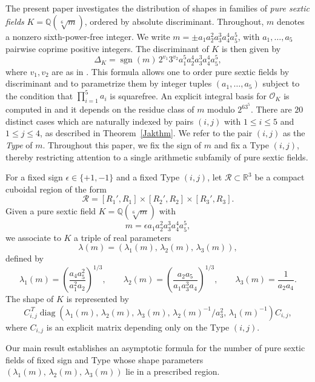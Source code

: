 \documentclass[table]{amsart}
\newcommand{\Q}{\mathbb{Q}}
\newcommand{\cO}{\mathcal{O}}
\newcommand{\op}[1]{\operatorname{#1}}
\numberwithin{equation}{section}
\begin{document}
The present paper investigates the distribution of shapes in families of \emph{pure sextic fields} $K=\Q(\sqrt[6]{m})$,
ordered by absolute discriminant. Throughout, $m$ denotes a nonzero sixth-power-free integer. We write $m=\pm a_1 a_2^2 a_3^3 a_4^4 a_5^5$, with $a_1,\dots,a_5$ pairwise coprime positive integers. The discriminant of $K$ is then given by
\begin{equation}\label{v_1 v_2}
\Delta_K=\operatorname{sgn}(m)\, 2^{v_1}3^{v_2} a_1^5 a_2^4 a_3^3 a_4^4 a_5^5,
\end{equation}
where $v_1, v_2$ are as in \cite[Theorem 3.1]{J21}. This formula allows one to order pure sextic fields by discriminant and to parametrize them by integer tuples $(a_1,\dots,a_5)$ subject to the condition that $\prod_{i=1}^5 a_i$ is squarefree. An explicit integral basis for $\cO_K$ is computed in \cite{J21} and it depends on the residue class of $m$ modulo $2^63^5$. There are $20$ distinct cases which are naturally indexed by pairs $(i,j)$ with $1\leq i\leq 5$ and $1\leq j\leq 4$, as described in Theorem~\ref{Jakthm}. We refer to the pair $(i,j)$ as the \emph{Type} of $m$. Throughout this paper, we fix the sign of $m$ and fix a Type $(i,j)$, thereby restricting attention to a single arithmetic subfamily of pure sextic fields.

For a fixed sign $\epsilon\in\{+1,-1\}$ and a fixed Type $(i,j)$, let $\mathscr{R}\subset \mathbb{R}^3$ be a compact cuboidal region of the form
\[
\mathscr{R}=[R_1',R_1]\times [R_2',R_2]\times [R_3',R_3].
\]
Given a pure sextic field $K=\Q(\sqrt[6]{m})$ with
\[
m=\epsilon a_1 a_2^2 a_3^3 a_4^4 a_5^5,
\]
we associate to $K$ a triple of real parameters
\[
\lambda(m)=(\lambda_1(m),\,\lambda_2(m),\,\lambda_3(m)),
\]
defined by
\[
\lambda_1(m)=\left(\frac{a_4a_5^2}{a_1^2a_2}\right)^{1/3}, 
\qquad 
\lambda_2(m)=\left(\frac{a_2a_5}{a_1a_3^3a_4}\right)^{1/3}, 
\qquad 
\lambda_3(m) = \frac{1}{a_2a_4}.
\]
The shape of $K$ is represented by
\begin{equation}\label{shape eqn}C_{i,j}^{\,T}
\op{diag}\!\left(
\lambda_1(m),\,
\lambda_2(m),\,
\lambda_3(m),\,
\lambda_2(m)^{-1}/a_3^2,\,
\lambda_1(m)^{-1}
\right)
C_{i,j},
\end{equation}
where $C_{i,j}$ is an explicit matrix depending only on the Type $(i,j)$. 
\par Our main result establishes an asymptotic formula for the number of pure sextic fields of fixed sign and Type whose shape parameters $(\lambda_1(m),\, \lambda_2(m),\, \lambda_3(m))$ lie in a prescribed region.
\end{document}
